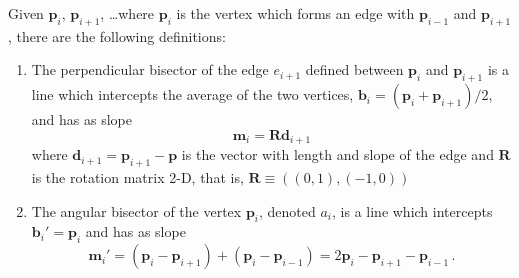 \documentclass{article}
\begin{document}
%
%
%
%
%
%
%
%

Given $\mathbf{p}_i$, $\mathbf{p}_{i+1}$, \ldots where $\mathbf{p}_i$ is the vertex which forms an edge with $\mathbf{p}_{i-1}$ and $\mathbf{p}_{i+1}$, there are the following definitions:

\begin{enumerate}
    \item The perpendicular bisector of the edge $e_{i+1}$ defined between $\mathbf{p}_i$ and $\mathbf{p}_{i+1}$ is a line which intercepts the average of the two vertices, $\mathbf{b}_i = (\mathbf{p}_i + \mathbf{p}_{i+1})/2$, and has as slope $$\mathbf{m}_i = \mathbf{R}\mathbf{d}_{i+1}$$ where $\mathbf{d}_{i+1} = \mathbf{p}_{i+1} - \mathbf{p}$ is the vector with length and slope of the edge and $\mathbf{R}$ is the rotation matrix 2-D, that is, $\mathbf{R} \equiv ((0,1),(-1,0))$
    \item The angular bisector of the vertex $\mathbf{p}_i$, denoted $a_i$, is a line which intercepts $\mathbf{b}_i' = \mathbf{p}_i$ and has as slope 
        $$ \mathbf{m}_i' = (\mathbf{p}_i - \mathbf{p}_{i+1}) + (\mathbf{p}_i - \mathbf{p}_{i-1})  = 2\mathbf{p}_i - \mathbf{p}_{i+1} - \mathbf{p}_{i-1} \,. $$
\end{enumerate}
\end{document}
